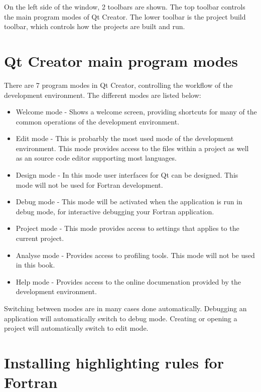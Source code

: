 On the left side of the window, 2 toolbars are shown. The top toolbar controls the main program modes of Qt Creator. The lower toolbar is the project build toolbar, which controls how the projects are built and run.

\section{Qt Creator main program modes}

There are 7 program modes in Qt Creator, controlling the workflow of the development environment. The different modes are listed below:

\begin{itemize}
\item Welcome mode - Shows a welcome screen, providing shortcuts for many of the common operations of the development environment.
\item Edit mode - This is probarbly the most used mode of the development environment. This mode provides access to the files within a project as well as an source code editor supporting most languages.
\item Design mode - In this mode user interfaces for Qt can be designed. This mode will not be used for Fortran development.
\item Debug mode - This mode will be activated when the application is run in debug mode, for interactive debugging your Fortran application.
\item Project mode - This mode provides access to settings that applies to the current project.
\item Analyse mode - Provides access to profiling tools. This mode will not be used in this book.
\item Help mode - Provides access to the online documenation provided by the development environment.
\end{itemize}

Switching between modes are in many cases done automatically. Debugging an application will automatically switch to debug mode. Creating or opening a project will automatically switch to edit mode.

\section{Installing highlighting rules for Fortran}

